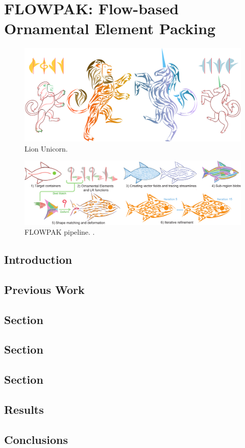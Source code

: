
\chapter{FLOWPAK: Flow-based Ornamental Element Packing}


\begin{figure}
\centering
\includegraphics[width=1.0\textwidth]{figures/flowpak/lion_unicorn.pdf} 
\caption{\label{fig_lion_unicorn} 
Lion Unicorn. }
\end{figure}

\begin{figure}
\centering
\includegraphics[width=1.0\textwidth]{figures/flowpak/pipeline.pdf} 
\caption{\label{fig_flowpak_pipeline} 
FLOWPAK pipeline. .}
\end{figure}

\section{Introduction}
\section{Previous Work}
\section{Section}
\section{Section}
\section{Section}
\section{Results}
\section{Conclusions}